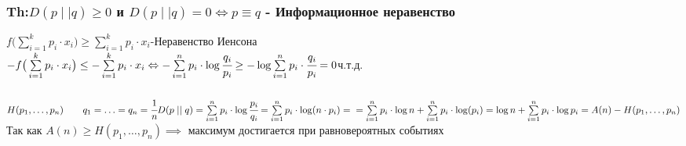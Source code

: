 \documentclass[12pt]{article}
\begin{document}
\subsubsection{Th:$D(p\mid\mid q)\geq 0$ и $D(p\mid\mid q)=0
        \Leftrightarrow p\equiv q$ - Информационное неравенство}
$f\big ( \sum\limits_{i=1}^k p_i\cdot x_i \big ) \geq \sum\limits_{i=1}^k p_i\cdot x_i$\quad-\quad Неравенство Иенсона\\
$-f\big ( \sum\limits_{i=1}^k p_i\cdot x_i \big ) \leq -\sum\limits_{i=1}^k p_i\cdot x_i \Leftrightarrow
    -\sum\limits_{i=1}^n p_i\cdot \log \cfrac{q_i}{ p_i} \geq -\log\sum\limits_{i=1}^n p_i\cdot  \cfrac{ q_i}{p_i}=0$ч.т.д.
\subsubsection{}
$H(p_1,\ldots,p_n)\qquad q_1=\ldots =q_n=\cfrac{1}{n}
    D(p\mid \mid q)=\sum\limits_{i=1}^n p_i\cdot \log \cfrac{p_i}{ q_i}=\sum\limits_{i=1}^n p_i\cdot \log (n\cdot p_i)=\\=
    \sum\limits_{i=1}^n p_i\cdot \log n+
    \sum\limits_{i=1}^n p_i\cdot \log (p_i)=\log n+
    \sum\limits_{i=1}^n p_i\cdot \log p_i = A(n)-H(p_1,\ldots,p_n)$\\
Так как $A(n)\geq H(p_1,\ldots,p_n) \implies$ максимум достигается при равновероятных событиях
\end{document}
